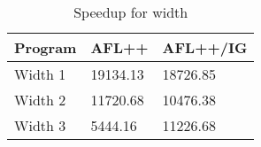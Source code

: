 \begin{table}
\caption{Speedup for width}
\label{tab:width_speedup}
\begin{tabular}{lll}
\toprule
Program & AFL++ & AFL++/IG \\
\midrule
Width 1 & 19134.13 & 18726.85 \\
Width 2 & 11720.68 & 10476.38 \\
Width 3 & 5444.16 & 11226.68 \\
\bottomrule
\end{tabular}
\end{table}
